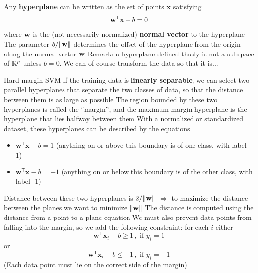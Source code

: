 \documentclass[aspectratio=169]{beamer}
\begin{document}
\begin{frame}
    Any \textbf{hyperplane} can be written as the set of points $\mathbf{x}$ satisfying
    \[
        \mathbf{w}^\mathsf{T} \mathbf{x} - b = 0
    \]
    where $\mathbf{w}$ is the (not necessarily normalized) \textbf{normal vector} to the hyperplane
    \vfill
    The parameter $b/\|\mathbf{w}\|$ determines the offset of the hyperplane from the origin along the normal vector $\mathbf{w}$
    \vfill
    Remark: a hyperplane defined thusly is not a subspace of $\mathbb{R}^p$ unless $b=0$. We can of course transform the data so that it is...
\end{frame}

\begin{frame}{Hard-margin SVM}
    If the training data is \textbf{linearly separable}, we can select two parallel hyperplanes that separate the two classes of data, so that the distance between them is as large as possible 
    \vfill
    The region bounded by these two hyperplanes is called the ``margin'', and the maximum-margin hyperplane is the hyperplane that lies halfway between them
    \vfill
    With a normalized or standardized dataset, these hyperplanes can be described by the equations
    \begin{itemize}
        \item $\mathbf{w}^\mathsf{T} \mathbf{x} - b = 1$ (anything on or above this boundary is of one class, with label 1) 
        \item $\mathbf{w}^\mathsf{T} \mathbf{x} - b = -1$ (anything on or below this boundary is of the other class, with label -1)
    \end{itemize}
\end{frame}

\begin{frame}
    Distance between these two hyperplanes is $2/\|\mathbf{w}\|$
    \vfilll
    $\Rightarrow$ to maximize the distance between the planes we want to minimize $\|\mathbf{w}\|$
    \vfill
    The distance is computed using the distance from a point to a plane equation
    \vfill
    We must also prevent data points from falling into the margin, so we add the following constraint: for each $i$ either
    \[
        \mathbf{w}^\mathsf{T} \mathbf{x}_i - b \ge 1 \, , \text{ if } y_i = 1
    \]
    or
    \[
        \mathbf{w}^\mathsf{T} \mathbf{x}_i - b \le -1 \, , \text{ if } y_i = -1
    \]
    \vfill
    (Each data point must lie on the correct side of the margin)
\end{frame}
\end{document}
